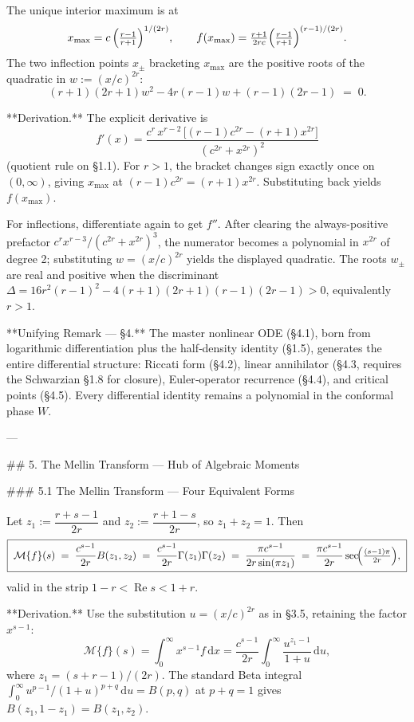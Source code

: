 The unique interior maximum is at
$$
x_{\max} = c\,\Bigl(\tfrac{r-1}{r+1}\Bigr)^{1/(2r)},\qquad f(x_{\max}) = \tfrac{r+1}{2rc}\Bigl(\tfrac{r-1}{r+1}\Bigr)^{(r-1)/(2r)}.
$$
The two inflection points $x_{\pm}$ bracketing $x_{\max}$ are the positive roots of the quadratic in $w := (x/c)^{2r}$:
$$
(r+1)(2r+1)w^{2} - 4r(r-1)w + (r-1)(2r-1) \;=\; 0.
$$

**Derivation.** The explicit derivative is
$$
f'(x) = \frac{c^{r}\,x^{r-2}\,\bigl[(r-1)c^{2r} - (r+1)x^{2r}\bigr]}{(c^{2r}+x^{2r})^{2}}
$$
(quotient rule on §1.1). For $r>1$, the bracket changes sign exactly once on $(0,\infty)$, giving $x_{\max}$ at $(r-1)c^{2r} = (r+1)x^{2r}$. Substituting back yields $f(x_{\max})$.

For inflections, differentiate again to get $f''$. After clearing the always-positive prefactor $c^{r}x^{r-3}/(c^{2r}+x^{2r})^{3}$, the numerator becomes a polynomial in $x^{2r}$ of degree 2; substituting $w=(x/c)^{2r}$ yields the displayed quadratic. The roots $w_{\pm}$ are real and positive when the discriminant $\Delta = 16r^{2}(r-1)^{2} - 4(r+1)(2r+1)(r-1)(2r-1) > 0$, equivalently $r>1$.

**Unifying Remark — §4.** The master nonlinear ODE (§4.1), born from logarithmic differentiation plus the half‑density identity (§1.5), generates the entire differential structure: Riccati form (§4.2), linear annihilator (§4.3, requires the Schwarzian §1.8 for closure), Euler‑operator recurrence (§4.4), and critical points (§4.5). Every differential identity remains a polynomial in the conformal phase $W$.

---

## 5. The Mellin Transform — Hub of Algebraic Moments

### 5.1 The Mellin Transform — Four Equivalent Forms

Let $z_{1} := \dfrac{r+s-1}{2r}$ and $z_{2} := \dfrac{r+1-s}{2r}$, so $z_{1}+z_{2}=1$. Then
$$
\boxed{\;\mathcal M\{f\}(s) \;=\; \frac{c^{s-1}}{2r}B(z_{1},z_{2}) \;=\; \frac{c^{s-1}}{2r}\Gamma(z_{1})\Gamma(z_{2}) \;=\; \frac{\pi c^{s-1}}{2r\sin(\pi z_{1})} \;=\; \frac{\pi c^{s-1}}{2r}\sec\!\Bigl(\tfrac{(s-1)\pi}{2r}\Bigr),\;}
$$
valid in the strip $1-r<\operatorname{Re} s<1+r$.

**Derivation.** Use the substitution $u = (x/c)^{2r}$ as in §3.5, retaining the factor $x^{s-1}$:
$$
\mathcal M\{f\}(s) = \int_{0}^{\infty}x^{s-1}f\,\mathrm dx = \frac{c^{s-1}}{2r}\int_{0}^{\infty}\frac{u^{z_{1}-1}}{1+u}\,\mathrm du,
$$
where $z_{1} = (s+r-1)/(2r)$. The standard Beta integral $\int_{0}^{\infty}u^{p-1}/(1+u)^{p+q}\,\mathrm du = B(p,q)$ at $p+q=1$ gives $B(z_{1},1-z_{1}) = B(z_{1},z_{2})$.


